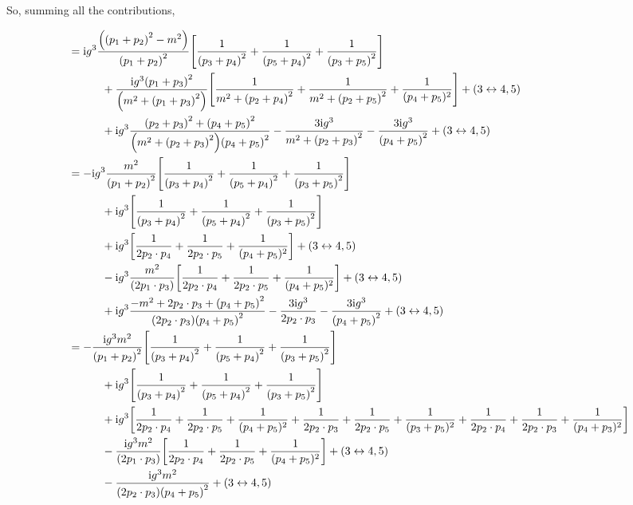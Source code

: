 So, summing all the contributions,

\begin{align*}
    &=\im g^3\frac{\qty(\qty(p_1+p_2)^2-m^2)}{\qty(p_1+p_2)^2}\qty[\frac{1}{\qty(p_3+p_4)^2}+\frac{1}{\qty(p_5+p_4)^2}+\frac{1}{\qty(p_3+p_5)^2}]\\
    &\quad\quad\quad+\frac{\im g^3\qty(p_1+p_3)^2}{\qty(m^2+\qty(p_1+p_3)^2)}\qty[\frac{1}{m^2+\qty(p_2+p_4)^2}+\frac{1}{m^2+\qty(p_2+p_5)^2}+\frac{1}{(p_4+p_5)^2}]+\qty(3\leftrightarrow4,5)\\
    &\quad\quad\quad+\im g^3\frac{\qty(p_2+p_3)^2+\qty(p_4+p_5)^2}{\qty(m^2+\qty(p_2+p_3)^2)\qty(p_4+p_5)^2}-\frac{3\im g^3}{m^2+\qty(p_2+p_3)^2}-\frac{3\im g^3}{\qty(p_4+p_5)^2}+\qty(3\leftrightarrow4,5)\\
    &=-\im g^3\frac{m^2}{\qty(p_1+p_2)^2}\qty[\frac{1}{\qty(p_3+p_4)^2}+\frac{1}{\qty(p_5+p_4)^2}+\frac{1}{\qty(p_3+p_5)^2}]\\
    &\quad\quad\quad+\im g^3\qty[\frac{1}{\qty(p_3+p_4)^2}+\frac{1}{\qty(p_5+p_4)^2}+\frac{1}{\qty(p_3+p_5)^2}]\\
    &\quad\quad\quad+\im g^3\qty[\frac{1}{2p_2\cdot p_4}+\frac{1}{2p_2\cdot p_5}+\frac{1}{(p_4+p_5)^2}]+\qty(3\leftrightarrow4,5)\\
    &\quad\quad\quad-\im g^3\frac{m^2}{\qty(2p_1\cdot p_3)}\qty[\frac{1}{2p_2\cdot p_4}+\frac{1}{2p_2\cdot p_5}+\frac{1}{(p_4+p_5)^2}]+\qty(3\leftrightarrow4,5)\\
    &\quad\quad\quad+\im g^3\frac{-m^2+2p_2\cdot p_3+\qty(p_4+p_5)^2}{\qty(2p_2\cdot p_3)\qty(p_4+p_5)^2}-\frac{3\im g^3}{2p_2\cdot p_3}-\frac{3\im g^3}{\qty(p_4+p_5)^2}+\qty(3\leftrightarrow4,5)\\
    &=-\frac{\im g^3m^2}{\qty(p_1+p_2)^2}\qty[\frac{1}{\qty(p_3+p_4)^2}+\frac{1}{\qty(p_5+p_4)^2}+\frac{1}{\qty(p_3+p_5)^2}]\\
    &\quad\quad\quad+\im g^3\qty[\frac{1}{\qty(p_3+p_4)^2}+\frac{1}{\qty(p_5+p_4)^2}+\frac{1}{\qty(p_3+p_5)^2}]\\
    &\quad\quad\quad+\im g^3\qty[\frac{1}{2p_2\cdot p_4}+\frac{1}{2p_2\cdot p_5}+\frac{1}{(p_4+p_5)^2}+\frac{1}{2p_2\cdot p_3}+\frac{1}{2p_2\cdot p_5}+\frac{1}{(p_3+p_5)^2}+\frac{1}{2p_2\cdot p_4}+\frac{1}{2p_2\cdot p_3}+\frac{1}{(p_4+p_3)^2}]\\
    &\quad\quad\quad-\frac{\im g^3m^2}{\qty(2p_1\cdot p_3)}\qty[\frac{1}{2p_2\cdot p_4}+\frac{1}{2p_2\cdot p_5}+\frac{1}{(p_4+p_5)^2}]+\qty(3\leftrightarrow4,5)\\
    &\quad\quad\quad-\frac{\im g^3m^2}{\qty(2p_2\cdot p_3)\qty(p_4+p_5)^2}+\qty(3\leftrightarrow4,5)\\

\end{align*}
